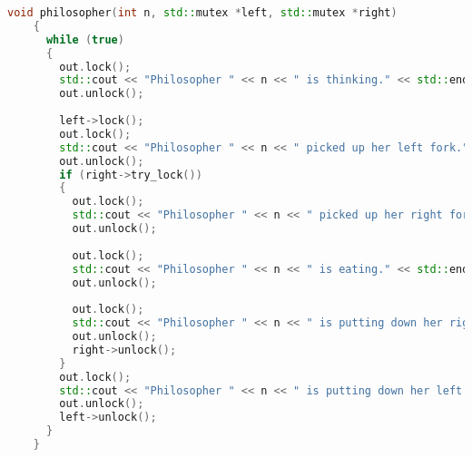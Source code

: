 \begin{lstlisting}[language=C++, caption=Arbitrator/Waiter code modification]
    void philosopher(int n, std::mutex *left, std::mutex *right)
    {
      while (true)
      {
        out.lock();
        std::cout << "Philosopher " << n << " is thinking." << std::endl;
        out.unlock();
    
        left->lock();
        out.lock();
        std::cout << "Philosopher " << n << " picked up her left fork." << std::endl;
        out.unlock();
        if (right->try_lock())
        {
          out.lock();
          std::cout << "Philosopher " << n << " picked up her right fork." << std::endl;
          out.unlock();
    
          out.lock();
          std::cout << "Philosopher " << n << " is eating." << std::endl;
          out.unlock();
    
          out.lock();
          std::cout << "Philosopher " << n << " is putting down her right fork." << std::endl;
          out.unlock();
          right->unlock();
        }
        out.lock();
        std::cout << "Philosopher " << n << " is putting down her left fork." << std::endl;
        out.unlock();
        left->unlock();
      }
    }
\end{lstlisting}